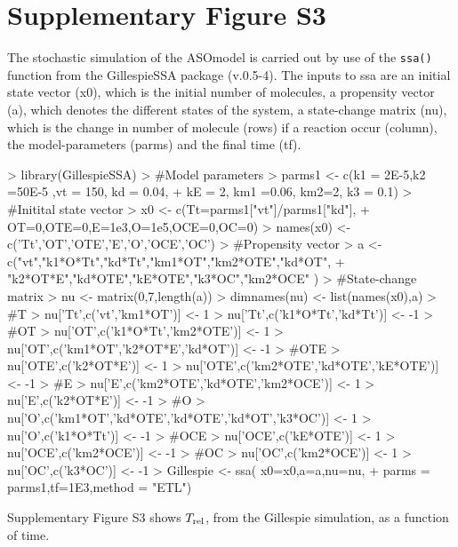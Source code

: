 \documentclass[a4paper,11pt]{article}
\newcommand{\Trel}{T_{\rm{rel}}}
\begin{document}
\section{Supplementary Figure S3}
The stochastic simulation of the ASOmodel is carried out by use of the \texttt{ssa()} function from the GillespieSSA package (v.0.5-4). The inputs to ssa are an initial state vector (x0), which is the initial number of molecules, a propensity vector (a), which denotes the different states of the system, a state-change matrix (nu), which is the change in number of molecule (rows) if a reaction occur (column), the model-parameters (parms) and the final time (tf).
\begin{Schunk}
\begin{Sinput}
> library(GillespieSSA)
> #Model parameters
> parms1 <- c(k1 = 2E-5,k2 =50E-5 ,vt = 150,  kd = 0.04,		  
+               kE = 2, km1 =0.06, km2=2, k3 = 0.1)
> #Initital state vector
> x0 <- c(Tt=parms1["vt"]/parms1["kd"],
+         OT=0,OTE=0,E=1e3,O=1e5,OCE=0,OC=0)
> names(x0) <- c('Tt','OT','OTE','E','O','OCE','OC')
> #Propensity vector
> a <-  c("vt","k1*O*Tt","kd*Tt","km1*OT","km2*OTE","kd*OT",
+         "k2*OT*E","kd*OTE","kE*OTE","k3*OC","km2*OCE" )
> #State-change matrix
> nu <- matrix(0,7,length(a))
> dimnames(nu) <- list(names(x0),a)
> #T
> nu['Tt',c('vt','km1*OT')] <- 1
> nu['Tt',c('k1*O*Tt','kd*Tt')] <- -1 
> #OT
> nu['OT',c('k1*O*Tt','km2*OTE')] <- 1
> nu['OT',c('km1*OT','k2*OT*E','kd*OT')] <- -1
> #OTE
> nu['OTE',c('k2*OT*E')] <- 1
> nu['OTE',c('km2*OTE','kd*OTE','kE*OTE')] <- -1
> #E
> nu['E',c('km2*OTE','kd*OTE','km2*OCE')] <- 1
> nu['E',c('k2*OT*E')] <- -1
> #O
> nu['O',c('km1*OT','kd*OTE','kd*OTE','kd*OT','k3*OC')] <- 1
> nu['O',c('k1*O*Tt')] <- -1
> #OCE
> nu['OCE',c('kE*OTE')] <- 1
> nu['OCE',c('km2*OCE')] <- -1
> #OC
> nu['OC',c('km2*OCE')] <- 1
> nu['OC',c('k3*OC')] <- -1
> Gillespie <- ssa( x0=x0,a=a,nu=nu,
+       parms = parms1,tf=1E3,method = "ETL")
\end{Sinput}
\end{Schunk}
Supplementary Figure S3 shows $\Trel$, from the Gillespie simulation, as a function of time.
\end{document}
